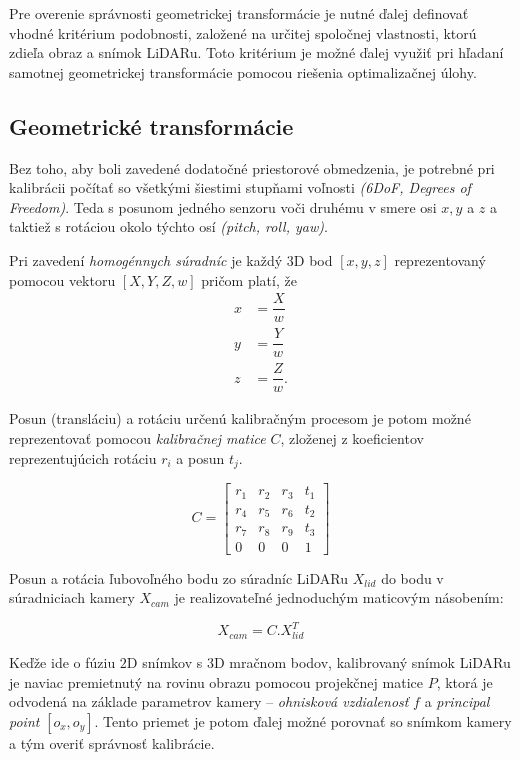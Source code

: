 \documentclass[12pt, a4paper]{article}
\begin{document}
Pre overenie správnosti geometrickej transformácie je nutné ďalej definovať vhodné kritérium podobnosti, založené na určitej spoločnej vlastnosti, ktorú zdieľa obraz a snímok LiDARu. Toto kritérium je možné ďalej využiť pri hľadaní samotnej geometrickej transformácie pomocou riešenia optimalizačnej úlohy.

\subsection{Geometrické transformácie}
Bez toho, aby boli zavedené dodatočné priestorové obmedzenia, je potrebné pri kalibrácii počítať so všetkými šiestimi stupňami voľnosti \emph{(6DoF, Degrees of Freedom)}\cite{taylor}. Teda s posunom jedného senzoru voči druhému v smere osi $x, y$ a $z$ a taktiež s rotáciou okolo týchto osí \emph{(pitch, roll, yaw)}.

Pri zavedení \emph{homogénnych súradníc} je každý $3$D bod $[x, y, z]$ reprezentovaný pomocou vektoru $[X, Y, Z, w]$ pričom platí, že
\begin{eqnarray}
	x &= \dfrac{X}{w} \\
	y &= \dfrac{Y}{w} \\
	z &= \dfrac{Z}{w}.
\end{eqnarray}

Posun (transláciu) a rotáciu určenú kalibračným procesom je potom možné reprezentovať pomocou \emph{kalibračnej matice} $C$, zloženej z koeficientov reprezentujúcich rotáciu $r_{i}$ a posun $t_j$. 

\begin{equation}
    C = \left[ 
      \begin{array}{cccc} 
	r_1 & r_2 & r_3 & t_1 \\
	r_4 & r_5 & r_6 & t_2 \\ 
	r_7 & r_8 & r_9 & t_3 \\
	0 & 0 & 0 & 1
      \end{array}  
      \right] \label{eq:translation}
\end{equation}

Posun a rotácia ľubovoľného bodu zo súradníc LiDARu $X_{lid}$ do bodu v súradniciach kamery $X_{cam}$ je realizovateľné jednoduchým maticovým násobením:

\begin{equation}
	X_{cam} = C . X_{lid}^T
\end{equation}

Keďže ide o fúziu $2$D snímkov s $3$D mračnom bodov, kalibrovaný snímok LiDARu je naviac premietnutý na rovinu obrazu pomocou projekčnej matice $P$, ktorá je odvodená na základe parametrov kamery -- \emph{ohnisková vzdialenosť} $f$ a \emph{principal point} $[o_x, o_y]$. Tento priemet je potom ďalej možné porovnať so snímkom kamery a tým overiť správnosť kalibrácie.
\end{document}
